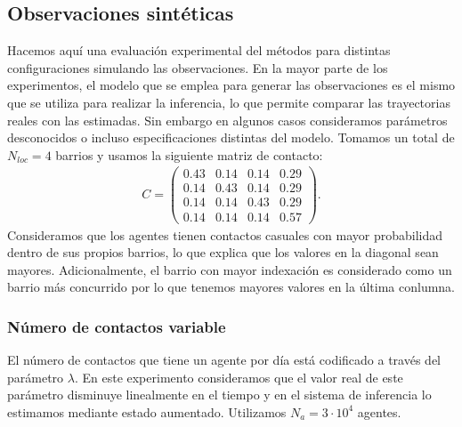 \subsection{Observaciones sintéticas}

Hacemos aquí una evaluación experimental del métodos para distintas configuraciones simulando las observaciones. En la mayor parte de los experimentos, el modelo que se emplea para generar las observaciones es el mismo que se utiliza para realizar la inferencia, lo que permite comparar las trayectorias reales con las estimadas. Sin embargo en algunos casos consideramos parámetros desconocidos o incluso especificaciones distintas del modelo. Tomamos un total de $N_{loc} = 4$ barrios y usamos la siguiente matriz de contacto:
\begin{align*}
    C = 
    \begin{pmatrix}
        0.43 & 0.14 & 0.14 & 0.29 \\
        0.14 & 0.43 & 0.14 & 0.29 \\
        0.14 & 0.14 & 0.43 & 0.29 \\
        0.14 & 0.14 & 0.14 & 0.57 
    \end{pmatrix}.
\end{align*}
Consideramos que los agentes tienen contactos casuales con mayor probabilidad dentro de sus propios barrios, lo que explica que los valores en la diagonal sean mayores. Adicionalmente, el barrio con mayor indexación es considerado como un barrio más concurrido por lo que tenemos mayores valores en la última conlumna.

\subsubsection{Número de contactos variable}

El número de contactos que tiene un agente por día está codificado a través del parámetro $\lambda$. En este experimento consideramos que el valor real de este parámetro disminuye linealmente en el tiempo y en el sistema de inferencia lo estimamos mediante estado aumentado. Utilizamos $N_a = 3 \cdot 10^4$ agentes.

